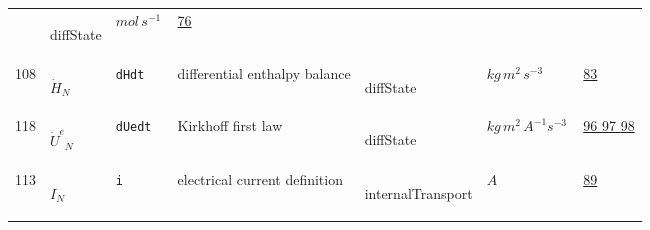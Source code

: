 \begin{longtable}{|p{1cm}|p{2.5cm}|p{4.5cm}|p{8cm}|p{3.0cm}|p{3cm}|p{1cm}|}
             & \begin{lay}diffState \end{lay}
             & $ mol \,s^{-1} \, $
             & \hyperlink{"e:76"}{ 76 }
                 \\
    108
             & \hypertarget{"v:108"}{ $ {{\dot{H}}}{_{N}} $}
             & \verb|dHdt|
             & differential enthalpy balance
             & \begin{lay}diffState \end{lay}
             & $ kg \,m^{2} \,s^{-3} \, $
             & \hyperlink{"e:83"}{ 83 }
                 \\
    118
             & \hypertarget{"v:118"}{ $ {{\dot{U}^e}}{_{N}} $}
             & \verb|dUedt|
             & Kirkhoff first law
             & \begin{lay}diffState \end{lay}
             & $ kg \,m^{2} \,A^{-1} s^{-3} \, $
             & \hyperlink{"e:96"}{ 96 }
                 \hyperlink{"e:97"}{ 97 }
                 \hyperlink{"e:98"}{ 98 }
                 \\
    113
             & \hypertarget{"v:113"}{ $ {I}{_{N}} $}
             & \verb|i|
             & electrical current definition
             & \begin{lay}internalTransport \end{lay}
             & $ A \, $
             & \hyperlink{"e:89"}{ 89 }
                 \\
    \end{longtable}